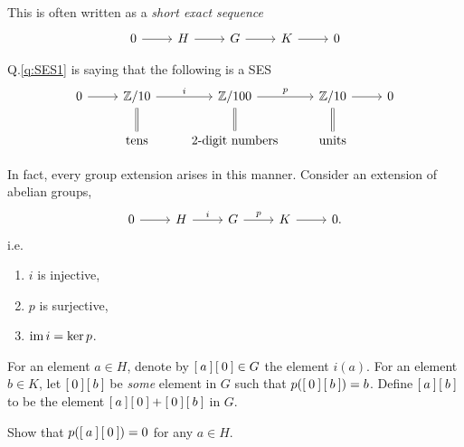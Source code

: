 This is often written as a \emph{short exact sequence}
\begin{equation*}
  \begin{tikzcd}
    0 \ar[r] & H \ar[r] &  G  \ar[r] & K \ar[r] & 0
  \end{tikzcd}
\end{equation*}















\newpage
Q.\ref{q:SES1} is saying that the following is a SES
\begin{equation*}
  \begin{tikzcd}
    0 \ar[r] & \bbz/10 \ar[r,"i"] &  \bbz/100  \ar[r,"p"] & \bbz/10 \ar[r] & 0 \\
     & \mbox{tens} \ar[u, equal]  &  \mbox{2-digit numbers}  \ar[u,equal] & \mbox{units}  \ar[u, equal] &
  \end{tikzcd}
\end{equation*}

In fact, every group extension arises in this manner.
Consider an extension of abelian groups,
\begin{equation*}
  \begin{tikzcd}
    0 \ar[r] & H \ar[r,"i"] &  G  \ar[r, "p"] & K \ar[r] & 0.
  \end{tikzcd}
\end{equation*}
i.e.
\begin{enumerate}
  \item $i$ is injective,
  \item $p$ is surjective,
  \item $\operatorname{im} i = \ker p$.
\end{enumerate}

For an element $a \in H$, denote by $\left[\: a \:\right]\left[\: 0 \:\right] \in G$ the element $i(a)$.
For an element $b \in K$, let $\left[\: 0 \:\right]\left[\: b \:\right]$ be \emph{some} element in $G$ such that $p(\left[\: 0 \:\right]\left[\: b \:\right]) = b$.
Define $\left[\: a \:\right] \left[\: b \:\right]$ to be the element $\left[\: a \:\right]\left[\: 0 \:\right] + \left[\: 0 \:\right]\left[\: b \:\right]$ in $G$.

\begin{qbox}
  Show that $p(\left[\: a \:\right]\left[\: 0 \:\right]) = 0$ for any $a \in H$.
\end{qbox}


